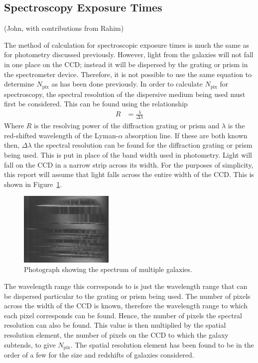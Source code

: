 \subsection{Spectroscopy Exposure Times} %
\label{sub:calculation_of_exposure_times}
(John, with contributions from Rahim)

	The method of calculation for spectroscopic exposure times is much the same as for photometry discussed previously. However, light from the galaxies will not fall in one place on the CCD; instead it will be dispersed by the grating or prism in the spectrometer device. Therefore, it is not possible to use the same equation to determine $N_\text{pix}$ as has been done previously. In order to calculate $N_\text{pix}$ for spectroscopy, the spectral resolution of the dispersive medium being used must first be considered. This can be found using the relationship
	\begin{align}
		R &= \frac{\lambda}{\Delta\lambda}
	\end{align}
	Where $R$ is the resolving power of the diffraction grating or prism and $\lambda$ is the red-shifted wavelength of the Lyman-$\alpha$ absorption line. If these are both known then, $\Delta\lambda$ the spectral resolution can be found for the diffraction grating or prism being used. This is put in place of the band width used in photometry. Light will fall on the CCD in a narrow strip across its width. For the purposes of simplicity, this report will assume that light falls across the entire width of the CCD. This is shown in Figure~\ref{fig:multi_object_spectrum}.
	\begin{figure}[htbp]
		\centering
		\includegraphics[width=0.4\textwidth]{../Images/Multi_Object_spectrum_picture.png}
		\caption{Photograph showing the spectrum of multiple galaxies.\label{fig:multi_object_spectrum}}
	\end{figure}

	The wavelength range this corresponds to is just the wavelength range that can be dispersed particular to the grating or prism being used. The number of pixels across the width of the CCD is known, therefore the wavelength range to which each pixel corresponds can be found. Hence, the number of pixels the spectral resolution can also be found. This value is then multiplied by the spatial resolution element, the number of pixels on the CCD to which the galaxy subtends, to give $N_\text{pix}$. The spatial resolution element has been found to be in the order of a few for the size and redshifts of galaxies considered\cite{SpatialRes}.

